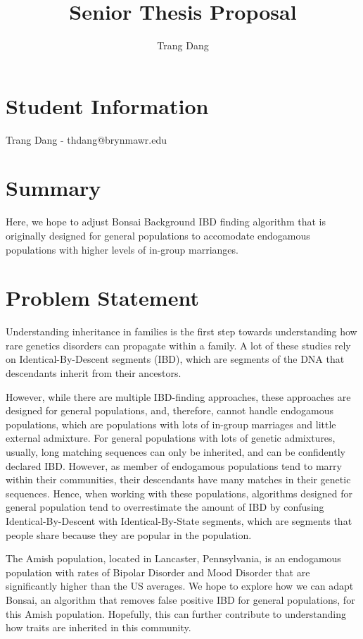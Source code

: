 \documentclass[12pt]{article}
\title{Senior Thesis Proposal}
\author{Trang Dang}
\makeatletter
\let\inserttitle\@title
\let\insertauthor\@author
\makeatother
\begin{document}
\begin{center}
  \LARGE{\inserttitle}

  \Large{\insertauthor}
\end{center}

\section{Student Information}

Trang Dang - thdang@brynmawr.edu

\section{Summary}


Here, we hope to adjust Bonsai\cite{Jewett2021} Background IBD finding algorithm that is originally designed for general populations to accomodate endogamous populations with higher levels of in-group marrianges. 

\section{Problem Statement}

Understanding inheritance in families is the first step towards understanding how rare genetics disorders can propagate within a family. A lot of these studies rely on Identical-By-Descent segments (IBD), which are segments of the DNA that descendants inherit from their ancestors. 

However, while there are multiple IBD-finding approaches, these approaches are designed for general populations, and, therefore, cannot handle endogamous populations, which are populations with lots of in-group marriages and little external admixture. 
For general populations with lots of genetic admixtures, usually, long matching sequences can only be inherited, and can be confidently declared IBD. 
However, as member of endogamous populations tend to marry within their communities, their descendants have many matches in their genetic sequences. 
Hence, when working with these populations, algorithms designed for general population tend to overrestimate the amount of IBD by confusing Identical-By-Descent with Identical-By-State segments, which are segments that people share because they are popular in the population. 

The Amish population, located in Lancaster, Pennsylvania, is an endogamous population with rates of Bipolar Disorder and Mood Disorder that are significantly higher than the US averages. We hope to explore how we can adapt Bonsai\cite{Jewett2021}, an algorithm that removes false positive IBD for general populations, for this Amish population. Hopefully, this can further contribute to understanding how traits are inherited in this community. 
\end{document}
